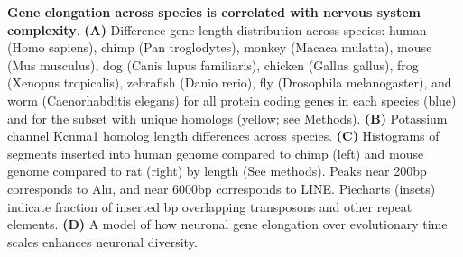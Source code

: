 \textbf{Gene elongation across species is correlated with nervous system complexity}.
\textbf{(A)} Difference gene length distribution across species: human (Homo sapiens), chimp (Pan troglodytes), monkey (Macaca mulatta), mouse (Mus musculus), dog (Canis lupus familiaris), chicken (Gallus gallus), frog (Xenopus tropicalis), zebrafish (Danio rerio), fly (Drosophila melanogaster), and worm (Caenorhabditis  elegans) for all protein coding genes in each species (blue) and for the subset with unique homologs (yellow; see Methods). 
\textbf{(B)} Potassium channel Kcnma1 homolog length differences across species.
\textbf{(C)} Histograms of segments inserted into human genome compared to chimp (left) and mouse genome compared to rat (right) by length (See methods). Peaks near 200bp corresponds to Alu, and near 6000bp corresponds to LINE. Piecharts (insets) indicate fraction of inserted bp overlapping transposons and other repeat elements.
\textbf{(D)} A model of how neuronal gene elongation over evolutionary time scales enhances neuronal diversity. 

